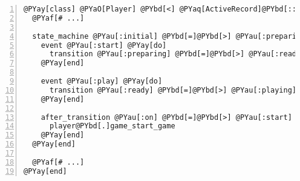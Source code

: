 \begin{Verbatim}[commandchars=@\[\],numbers=left,firstnumber=1,stepnumber=1]
@PYay[class] @PYaO[Player] @PYbd[<] @PYaq[ActiveRecord]@PYbd[::]@PYaq[Base]
  @PYaf[# ...]

  state_machine @PYau[:initial] @PYbd[=]@PYbd[>] @PYau[:preparing] @PYay[do]
    event @PYau[:start] @PYay[do]
      transition @PYau[:preparing] @PYbd[=]@PYbd[>] @PYau[:ready]
    @PYay[end]

    event @PYau[:play] @PYay[do]
      transition @PYau[:ready] @PYbd[=]@PYbd[>] @PYau[:playing]
    @PYay[end]

    after_transition @PYau[:on] @PYbd[=]@PYbd[>] @PYau[:start] @PYay[do] @PYbd[|]player@PYbd[|]
      player@PYbd[.]game_start_game
    @PYay[end]
  @PYay[end]

  @PYaf[# ...]
@PYay[end]
\end{Verbatim}
